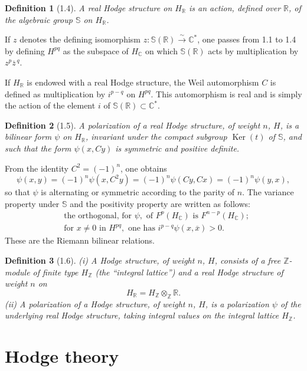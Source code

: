 \documentclass[10pt]{article}
\newcommand{\C}{\mathbb C}
\newcommand{\R}{\mathbb R}
\newcommand{\Z}{\mathbb Z}
\newcommand{\bS}{\mathbb S}
\newcommand{\Ker}{\operatorname{Ker}}
\theoremstyle{deligne}
\newtheorem*{definition}{Definition}
\begin{document}
\begin{definition}[1.4]
A real Hodge structure on $H_\R$ is an action, defined over $\R$, of the algebraic group $\bS$ on $H_\R$.
\end{definition}

If $z$ denotes the defining isomorphism $z:\bS(\R)\xrightarrow{\sim}\C^*$, one passes from 1.1 to 1.4 by defining $H^{pq}$ as the subspace of $H_\C$ on which $\bS(\R)$ acts by multiplication by $z^p\overline z^{\,q}$.

If $H_\R$ is endowed with a real Hodge structure, the Weil automorphism $C$ is defined as multiplication by $i^{p-q}$ on $H^{pq}$. This automorphism is real and is simply the action of the element $i$ of $\bS(\R)\subset\C^*$.

\begin{definition}[1.5]
A polarization of a real Hodge structure, of weight $n$, $H$, is a bilinear form $\psi$ on $H_\R$, invariant under the compact subgroup $\Ker(t)$ of $\bS$, and such that the form $\psi(x,Cy)$ is symmetric and positive definite.
\end{definition}

From the identity $C^2=(-1)^n$, one obtains
\[
\psi(x,y)=(-1)^n\psi(x,C^2y)=(-1)^n\psi(Cy,Cx)=(-1)^n\psi(y,x),
\]
so that $\psi$ is alternating or symmetric according to the parity of $n$. The variance property under $\bS$ and the positivity property are written as follows:
\begin{align}
&\text{the orthogonal, for }\psi,\text{ of }F^p(H_\C)\text{ is }F^{n-p}(H_\C);\tag{1.5.1}\\
&\text{for }x\ne0\text{ in }H^{pq},\text{ one has } i^{p-q}\psi(x,\overline x)>0.\tag{1.5.2}
\end{align}
These are the Riemann bilinear relations.

\begin{definition}[1.6]
(i) A Hodge structure, of weight $n$, $H$, consists of a free $\Z$-module of finite type $H_\Z$ (the ``integral lattice'') and a real Hodge structure of weight $n$ on
\[
H_\R=H_\Z\otimes_\Z\R .
\]
(ii) A polarization of a Hodge structure, of weight $n$, $H$, is a polarization $\psi$ of the underlying real Hodge structure, taking integral values on the integral lattice $H_\Z$.
\end{definition}

\section{Hodge theory}
\end{document}
